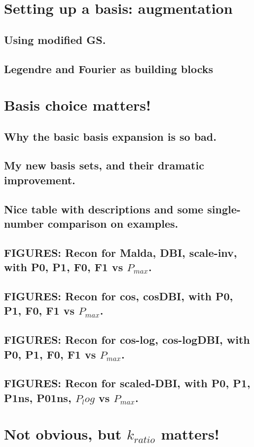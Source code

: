 \section{Setting up a basis: augmentation}
    \subsection{Using modified GS.}
    \subsection{Legendre and Fourier as building blocks}
\section{Basis choice matters!}
    \subsection{Why the basic basis expansion is so bad.}
    \subsection{My new basis sets, and their dramatic improvement.}
    \subsection{Nice table with descriptions and some single-number comparison on examples.}
    \subsection{FIGURES: Recon for Malda, DBI, scale-inv, with P0, P1, F0, F1 vs $P_{max}$.}
    \subsection{FIGURES: Recon for cos, cosDBI, with P0, P1, F0, F1 vs $P_{max}$.}
    \subsection{FIGURES: Recon for cos-log, cos-logDBI, with P0, P1, F0, F1 vs $P_{max}$.}
    \subsection{FIGURES: Recon for scaled-DBI, with P0, P1, P1ns, P01ns, $P_log$ vs $P_{max}$.}
\section{Not obvious, but $k_{ratio}$ matters!}
